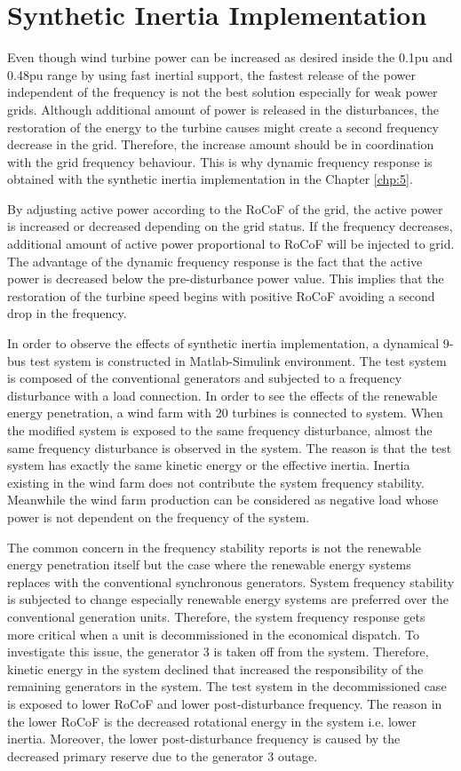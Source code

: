 \section{Synthetic Inertia Implementation}
Even though wind turbine power can be increased as desired inside the 0.1pu and 0.48pu range by using fast inertial support, the fastest release of the power independent of the frequency is not the best solution especially for weak power grids. Although additional amount of power is released in the disturbances, the restoration of the energy to the turbine causes might create a second frequency decrease in the grid. Therefore, the increase amount should be in coordination with the grid frequency behaviour. This is why dynamic frequency response is obtained with the synthetic inertia implementation in the Chapter \ref{chp:5}. \par
By adjusting active power according to the RoCoF of the grid, the active power is increased or decreased depending on the grid status. If the frequency decreases, additional amount of active power proportional to RoCoF will be injected to grid. The advantage of the dynamic frequency response is the fact that the active power is decreased below the pre-disturbance power value. This implies that the restoration of the turbine speed begins with positive RoCoF avoiding a second drop in the frequency.\par
In order to observe the effects of synthetic inertia implementation, a dynamical 9-bus test system is constructed in Matlab-Simulink environment. The test system is composed of the conventional generators and subjected to a frequency disturbance with a load connection. In order to see the effects of the renewable energy penetration, a wind farm with 20 turbines is connected to system. When the modified system is exposed to the same frequency disturbance, almost the same frequency disturbance is observed in the system. The reason is that the test system has exactly the same kinetic energy or the effective inertia. Inertia existing in the wind farm does not contribute the system frequency stability. Meanwhile the wind farm production can be considered as negative load whose power is not dependent on the frequency of the system.\par
The common concern in the frequency stability reports is not the renewable energy penetration itself but the case where the renewable energy systems replaces with the conventional synchronous generators. System frequency stability is subjected to change especially renewable energy systems are preferred over the conventional generation units. Therefore, the system frequency response gets more critical when a unit is decommissioned in the economical dispatch. To investigate this issue, the generator 3 is taken off from the system. Therefore, kinetic energy in the system declined that increased the responsibility of the remaining generators in the system. The test system in the decommissioned case is exposed to lower RoCoF and lower post-disturbance frequency.  The reason in the lower RoCoF is the decreased rotational energy in the system i.e. lower inertia. Moreover, the lower post-disturbance frequency is caused by the decreased primary reserve due to the generator 3 outage.\par
